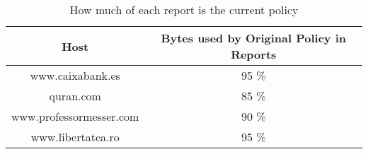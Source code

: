 \begin{table}[h]
\begin{center}
\begin{tabular}{| c c |}
	\hline
	Host & Bytes used by Original Policy in Reports \\ \hline
	www.caixabank.es        & 95 \% \\ \hline 
	quran.com               & 85 \% \\ \hline 
	www.professormesser.com & 90 \% \\ \hline 
	www.libertatea.ro       & 95 \% \\ \hline 
\end{tabular}
\end{center}
	\caption{How much of each report is the current policy}
\label{tab:reduction}
\end{table}



%



